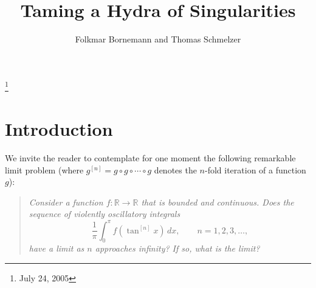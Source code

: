 \documentclass[10pt]{amsart}
\newcommand{\R}{{\mathbb  R}}
\begin{document}
\title{Taming a Hydra of Singularities}
\author{Folkmar Bornemann and Thomas Schmelzer}
\keywords{} \subjclass{}
\thanks{July 24, 2005}
\maketitle

\section{Introduction}
\noindent
We invite the reader to contemplate for one moment the following remarkable limit problem
(where $g^{[n]} = g \circ g \circ \cdots \circ g$ denotes the $n$-fold iteration of a function $g$):

\bigskip

\begin{quote}{\em
Consider a function $f: \R \to \R$ that is bounded and continuous. Does the sequence of violently oscillatory integrals
\[
\frac{1}{\pi}\int_0^\pi f(\tan^{[n]}x)\,dx, \qquad n=1,2,3,\ldots,
\]
have a limit as $n$ approaches infinity? If so, what is the limit?}
\end{quote}

\medskip
\end{document}
